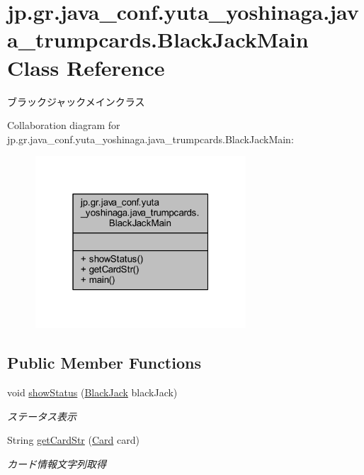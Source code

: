 \hypertarget{classjp_1_1gr_1_1java__conf_1_1yuta__yoshinaga_1_1java__trumpcards_1_1_black_jack_main}{}\section{jp.\+gr.\+java\+\_\+conf.\+yuta\+\_\+yoshinaga.\+java\+\_\+trumpcards.\+Black\+Jack\+Main Class Reference}
\label{classjp_1_1gr_1_1java__conf_1_1yuta__yoshinaga_1_1java__trumpcards_1_1_black_jack_main}


ブラックジャックメインクラス  




Collaboration diagram for jp.\+gr.\+java\+\_\+conf.\+yuta\+\_\+yoshinaga.\+java\+\_\+trumpcards.\+Black\+Jack\+Main\+:
\nopagebreak
\begin{figure}[H]
\begin{center}
\leavevmode
\includegraphics[width=223pt]{classjp_1_1gr_1_1java__conf_1_1yuta__yoshinaga_1_1java__trumpcards_1_1_black_jack_main__coll__graph}
\end{center}
\end{figure}
\subsection*{Public Member Functions}
\begin{DoxyCompactItemize}
\item 
void \hyperlink{classjp_1_1gr_1_1java__conf_1_1yuta__yoshinaga_1_1java__trumpcards_1_1_black_jack_main_aefaaf9d1dfc330af971cb1a167a9e8d9}{show\+Status} (\hyperlink{classjp_1_1gr_1_1java__conf_1_1yuta__yoshinaga_1_1java__trumpcards_1_1_black_jack}{Black\+Jack} black\+Jack)
\begin{DoxyCompactList}\small\item\em ステータス表示 \end{DoxyCompactList}\item 
String \hyperlink{classjp_1_1gr_1_1java__conf_1_1yuta__yoshinaga_1_1java__trumpcards_1_1_black_jack_main_a1f14eabe7d9a1438959860e323c39a6f}{get\+Card\+Str} (\hyperlink{classjp_1_1gr_1_1java__conf_1_1yuta__yoshinaga_1_1java__trumpcards_1_1_card}{Card} card)
\begin{DoxyCompactList}\small\item\em カード情報文字列取得 \end{DoxyCompactList}\end{DoxyCompactItemize}

